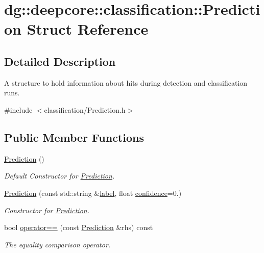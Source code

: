 \hypertarget{structdg_1_1deepcore_1_1classification_1_1_prediction}{}\section{dg\+:\+:deepcore\+:\+:classification\+:\+:Prediction Struct Reference}
\label{structdg_1_1deepcore_1_1classification_1_1_prediction}


\subsection{Detailed Description}
A structure to hold information about hits during detection and classification runs. 

{\ttfamily \#include $<$classification/\+Prediction.\+h$>$}

\subsection*{Public Member Functions}
\begin{DoxyCompactItemize}
\item 
\hyperlink{group___classification_module_gab393a5d0a2ff4d9ba72801a7d450a140}{Prediction} ()
\begin{DoxyCompactList}\small\item\em Default Constructor for \hyperlink{structdg_1_1deepcore_1_1classification_1_1_prediction}{Prediction}. \end{DoxyCompactList}\item 
\hyperlink{group___classification_module_ga4656207fb44b596eaf90bb5613f6f9aa}{Prediction} (const std\+::string \&\hyperlink{group___classification_module_gae1374a898e2380401c2e671786e69ff1}{label}, float \hyperlink{group___classification_module_gae7ab1c3906399dab0ee969ffc521bcfb}{confidence}=0.)
\begin{DoxyCompactList}\small\item\em Constructor for \hyperlink{structdg_1_1deepcore_1_1classification_1_1_prediction}{Prediction}. \end{DoxyCompactList}\item 
bool \hyperlink{structdg_1_1deepcore_1_1classification_1_1_prediction_aac4912ad9ef4cfbd390237c5cfacb289}{operator==} (const \hyperlink{structdg_1_1deepcore_1_1classification_1_1_prediction}{Prediction} \&rhs) const 
\begin{DoxyCompactList}\small\item\em The equality comparison operator. \end{DoxyCompactList}\end{DoxyCompactItemize}
